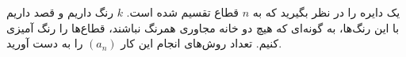 \EXERCISE
یک دایره را در نظر بگیرید که به 
$n$
قطاع تقسیم شده است. 
$k$
 رنگ داریم و قصد داریم با این رنگ‌ها، به گونه‌ای که هیچ دو خانه مجاوری همرنگ نباشند، قطاع‌ها را رنگ آمیزی کنیم. تعداد روش‌های انجام این کار
$(a_n)$
  را به دست آورید.